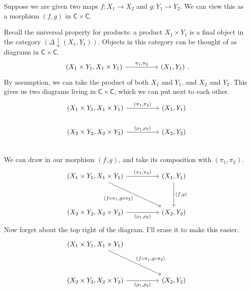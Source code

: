 \documentclass[a4paper]{report}
\theoremstyle{definition}
\theoremstyle{plain}
\theoremstyle{remark}
\begin{document}
Suppose we are given two maps $f\colon X_{1} \to X_{2}$ and $g\colon Y_{1} \to Y_{2}$. We can view this as a morphism $(f,g)$ in $\mathsf{C} \times \mathsf{C}$.

Recall the universal property for products: a product $X_{1}\times Y_{1}$ is a final object in the category $(\Delta \downarrow (X_{1}, Y_{1}))$. Objects in this category can be thought of as diagrams in $\mathsf{C} \times \mathsf{C}$.
\begin{equation*}
  \begin{tikzcd}[column sep=huge]
    {(X_{1}\times Y_{1}, X_{1}\times Y_{1})} \arrow[r, "{\pi_{1}, \pi_{2}}"] & {(X_{1}, Y_{1})}
  \end{tikzcd}.
\end{equation*}
By assumption, we can take the product of both $X_{1}$ and $Y_{1}$, and $X_{2}$ and $Y_{2}$. This gives us two diagrams living in $\mathsf{C} \times \mathsf{C}$, which we can put next to each other. 
\begin{equation*}
  \begin{tikzcd}[column sep=huge]
    {(X_{1} \times Y_{1}, X_{1} \times Y_{1})} \arrow[r, "{(\pi_{1}, \pi_{2})}"] & (X_{1}, Y_{1}) \\
    {(X_{2} \times Y_{2}, X_{2} \times Y_{2})} \arrow[r, "{(\rho_{1}, \rho_{2})}"] & (X_{2}, Y_{2}) \\
  \end{tikzcd}
\end{equation*}
We can draw in our morphism $(f,g)$, and take its composition with $(\pi_{1}, \pi_{2})$.
\begin{equation*}
  \begin{tikzcd}[row sep=huge, column sep=huge]
    {(X_{1} \times Y_{1}, X_{1} \times Y_{1})} \arrow[r, "{(\pi_{1}, \pi_{2})}"] \arrow[dr, swap, "{(f\circ \pi_{1}, g \circ \pi_{2})}"] & (X_{1}, Y_{1}) \arrow[d, "{(f,g)}"] \\
    {(X_{2} \times Y_{2}, X_{2} \times Y_{2})} \arrow[r, swap, "{(\rho_{1}, \rho_{2})}"] & (X_{2}, Y_{2}) 
  \end{tikzcd}
\end{equation*}
Now forget about the top right of the diagram. I'll erase it to make this easier.
\begin{equation*}
  \begin{tikzcd}[row sep=huge, column sep=huge]
    {(X_{1} \times Y_{1}, X_{1} \times Y_{1})}  \arrow[dr, "{(f\circ \pi_{1}, g \circ \pi_{2})}"] & \\
    {(X_{2} \times Y_{2}, X_{2} \times Y_{2})} \arrow[r, swap, "{(\rho_{1}, \rho_{2})}"] & (X_{2}, Y_{2})
  \end{tikzcd}
\end{equation*}
\end{document}
